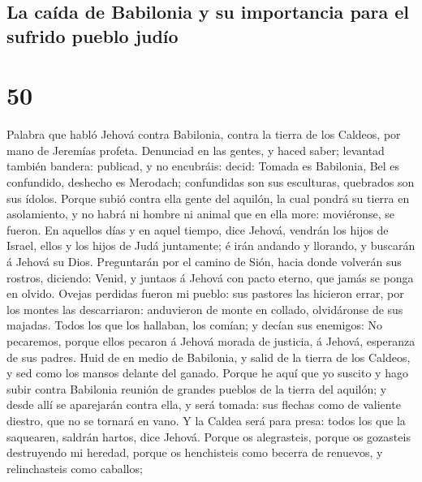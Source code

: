 \hypertarget{la-cauxedda-de-babilonia-y-su-importancia-para-el-sufrido-pueblo-juduxedo}{%
\subsection{La caída de Babilonia y su importancia para el sufrido
pueblo
judío}\label{la-cauxedda-de-babilonia-y-su-importancia-para-el-sufrido-pueblo-juduxedo}}

\hypertarget{section-49}{%
\section{50}\label{section-49}}

 Palabra que habló Jehová contra Babilonia, contra la
tierra de los Caldeos, por mano de Jeremías profeta. 
Denunciad en las gentes, y haced saber; levantad también bandera:
publicad, y no encubráis: decid: Tomada es Babilonia, Bel es confundido,
deshecho es Merodach; confundidas son sus esculturas, quebrados son sus
ídolos.  Porque subió contra ella gente del aquilón, la
cual pondrá su tierra en asolamiento, y no habrá ni hombre ni animal que
en ella more: moviéronse, se fueron.  En aquellos días y
en aquel tiempo, dice Jehová, vendrán los hijos de Israel, ellos y los
hijos de Judá juntamente; é irán andando y llorando, y buscarán á Jehová
su Dios.  Preguntarán por el camino de Sión, hacia donde
volverán sus rostros, diciendo: Venid, y juntaos á Jehová con pacto
eterno, que jamás se ponga en olvido.  Ovejas perdidas
fueron mi pueblo: sus pastores las hicieron errar, por los montes las
descarriaron: anduvieron de monte en collado, olvidáronse de sus
majadas.  Todos los que los hallaban, los comían; y decían
sus enemigos: No pecaremos, porque ellos pecaron á Jehová morada de
justicia, á Jehová, esperanza de sus padres.  Huid de en
medio de Babilonia, y salid de la tierra de los Caldeos, y sed como los
mansos delante del ganado.  Porque he aquí que yo suscito
y hago subir contra Babilonia reunión de grandes pueblos de la tierra
del aquilón; y desde allí se aparejarán contra ella, y será tomada: sus
flechas como de valiente diestro, que no se tornará en vano.
 Y la Caldea será para presa: todos los que la saquearen,
saldrán hartos, dice Jehová.  Porque os alegrasteis,
porque os gozasteis destruyendo mi heredad, porque os henchisteis como
becerra de renuevos, y relinchasteis como caballos; 
